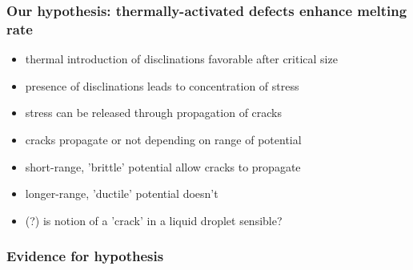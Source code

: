 \documentclass[11pt]{article}
\begin{document}
\subsubsection{Our hypothesis:  thermally-activated defects enhance melting rate}
\label{sec-3.1.3}

\begin{itemize}

\item thermal introduction of disclinations favorable after critical size\\
\label{sec-3.1.3.1}


\item presence of disclinations leads to concentration of stress\\
\label{sec-3.1.3.2}


\item stress can be released through propagation of cracks\\
\label{sec-3.1.3.3}


\item cracks propagate or not depending on range of potential\\
\label{sec-3.1.3.4}


\item short-range, 'brittle' potential allow cracks to propagate\\
\label{sec-3.1.3.5}


\item longer-range, 'ductile' potential doesn't\\
\label{sec-3.1.3.6}


\item (?) is notion of a 'crack' in a liquid droplet sensible?\\
\label{sec-3.1.3.7}

\end{itemize} %
\subsubsection{Evidence for hypothesis}
\label{sec-3.1.4}
\end{document}
